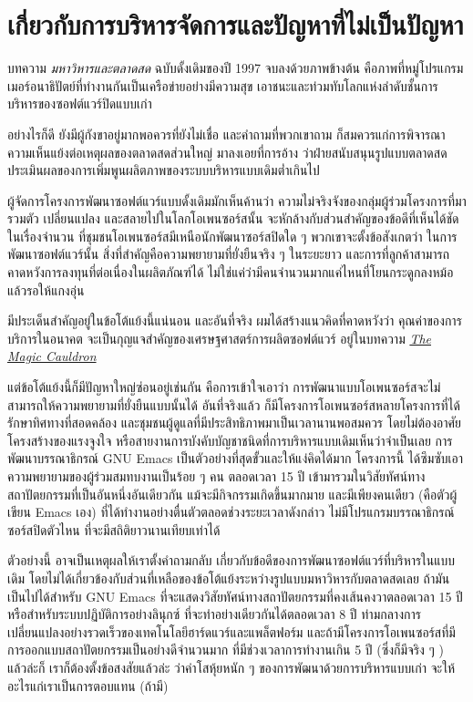 \chapter{เกี่ยวกับการบริหารจัดการและปัญหาที่ไม่เป็นปัญหา}

บทความ \emph{มหาวิหารและตลาดสด} ฉบับดั้งเดิมของปี 1997
จบลงด้วยภาพข้างต้น
คือภาพที่หมู่โปรแกรมเมอร์อนาธิปัตย์ที่ทำงานกันเป็นเครือข่ายอย่างมีความสุข
เอาชนะและท่วมทับโลกแห่งลำดับชั้นการบริหารของซอฟต์แวร์ปิดแบบเก่า

อย่างไรก็ดี ยังมีผู้กังขาอยู่มากพอควรที่ยังไม่เชื่อ และคำถามที่พวกเขาถาม
ก็สมควรแก่การพิจารณา ความเห็นแย้งต่อเหตุผลของตลาดสดส่วนใหญ่
มาลงเอยที่การอ้าง
ว่าฝ่ายสนับสนุนรูปแบบตลาดสดประเมินผลของการเพิ่มพูนผลิตภาพของระบบบริหารแบบเดิมต่ำเกินไป

ผู้จัดการโครงการพัฒนาซอฟต์แวร์แบบดั้งเดิมมักเห็นค้านว่า
ความไม่จริงจังของกลุ่มผู้ร่วมโครงการที่มารวมตัว เปลี่ยนแปลง
และสลายไปในโลกโอเพนซอร์สนั้น
จะหักล้างกับส่วนสำคัญของข้อดีที่เห็นได้ชัดในเรื่องจำนวน
ที่ชุมชนโอเพนซอร์สมีเหนือนักพัฒนาซอร์สปิดใด ๆ  พวกเขาจะตั้งข้อสังเกตว่า
ในการพัฒนาซอฟต์แวร์นั้น สิ่งที่สำคัญคือความพยายามที่ยั่งยืนจริง ๆ
ในระยะยาว และการที่ลูกค้าสามารถคาดหวังการลงทุนที่ต่อเนื่องในผลิตภัณฑ์ได้
ไม่ใช่แค่ว่ามีคนจำนวนมากแค่ไหนที่โยนกระดูกลงหม้อแล้วรอให้แกงอุ่น

มีประเด็นสำคัญอยู่ในข้อโต้แย้งนี้แน่นอน และอันที่จริง
ผมได้สร้างแนวคิดที่คาดหวังว่า คุณค่าของการบริการในอนาคต
จะเป็นกุญแจสำคัญของเศรษฐศาสตร์การผลิตซอฟต์แวร์ อยู่ในบทความ
\href{http://catb.org/~esr/writings/cathedral-bazaar/magic-cauldron/}{\emph{The
    Magic Cauldron}}

แต่ข้อโต้แย้งนี้ก็มีปัญหาใหญ่ซ่อนอยู่เช่นกัน คือการเข้าใจเอาว่า
การพัฒนาแบบโอเพนซอร์สจะไม่สามารถให้ความพยายามที่ยั่งยืนแบบนั้นได้
อันที่จริงแล้ว
ก็มีโครงการโอเพนซอร์สหลายโครงการที่ได้รักษาทิศทางที่สอดคล้อง
และชุมชนผู้ดูแลที่มีประสิทธิภาพมาเป็นเวลานานพอสมควร
โดยไม่ต้องอาศัยโครงสร้างของแรงจูงใจ
หรือสายงานการบังคับบัญชาชนิดที่การบริหารแบบเดิมเห็นว่าจำเป็นเลย
การพัฒนาบรรณาธิกรณ์ GNU Emacs เป็นตัวอย่างที่สุดขั้วและให้แง่คิดได้มาก
โครงการนี้ ได้ซึมซับเอาความพยายามของผู้ร่วมสมทบงานเป็นร้อย ๆ  คน ตลอดเวลา
15 ปี เข้ามารวมในวิสัยทัศน์ทางสถาปัตยกรรมที่เป็นอันหนึ่งอันเดียวกัน
แม้จะมีกิจกรรมเกิดขึ้นมากมาย และมีเพียงคนเดียว (คือตัวผู้เขียน Emacs
เอง) ที่ได้ทำงานอย่างตื่นตัวตลอดช่วงระยะเวลาดังกล่าว
ไม่มีโปรแกรมบรรณาธิกรณ์ซอร์สปิดตัวไหน ที่จะมีสถิติยาวนานเทียบเท่าได้

ตัวอย่างนี้ อาจเป็นเหตุผลให้เราตั้งคำถามกลับ
เกี่ยวกับข้อดีของการพัฒนาซอฟต์แวร์ที่บริหารในแบบเดิม
โดยไม่ได้เกี่ยวข้องกับส่วนที่เหลือของข้อโต้แย้งระหว่างรูปแบบมหาวิหารกับตลาดสดเลย
ถ้ามันเป็นไปได้สำหรับ GNU Emacs
ที่จะแสดงวิสัยทัศน์ทางสถาปัตยกรรมที่คงเส้นคงวาตลอดเวลา 15 ปี
หรือสำหรับระบบปฏิบัติการอย่างลินุกซ์ ที่จะทำอย่างเดียวกันได้ตลอดเวลา 8
ปี ท่ามกลางการเปลี่ยนแปลงอย่างรวดเร็วของเทคโนโลยีฮาร์ดแวร์และแพล็ตฟอร์ม
และถ้ามีโครงการโอเพนซอร์สที่มีการออกแบบสถาปัตยกรรมเป็นอย่างดีจำนวนมาก
ที่มีช่วงเวลาการทำงานเกิน 5 ปี (ซึ่งก็มีจริง ๆ ) แล้วล่ะก็
เราก็ต้องตั้งข้อสงสัยแล้วล่ะ ว่าค่าโสหุ้ยหนัก ๆ
ของการพัฒนาด้วยการบริหารแบบเก่า จะให้อะไรแก่เราเป็นการตอบแทน (ถ้ามี)

